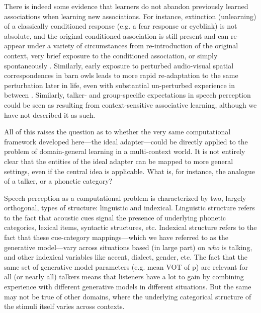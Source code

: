 There is indeed some evidence that learners do not abandon previously learned associations when learning new associations.  
For instance, extinction (unlearning) of a classically conditioned response (e.g. a fear response or eyeblink) is not absolute, and the original conditioned association is still present and can re-appear under a variety of circumstances from re-introduction of the original context, very brief exposure to the conditioned association, or simply spontaneously \cite{Thanellou2011,Bouton1983,Sissons2009}.
Similarly, early exposure to perturbed audio-visual spatial correspondences in barn owls leads to more rapid re-adaptation to the same perturbation later in life, even with substantial un-perturbed experience in between \cite{Kording2007a,Knudsen1998,Linkenhoker2005}.
Similarly, talker- and group-specific expectations in speech perception could be seen as resulting from  context-sensitive associative learning, although we have not described it as such.  

All of this raises the question as to whether the very same computational framework developed here---the ideal adapter---could be directly applied to the problem of domain-general learning in a multi-context world.  It is not entirely clear that the entities of the ideal adapter can be mapped to more general settings, even if the central idea is applicable.  What is, for instance, the analogue of a talker, or a phonetic category?

Speech perception as a computational problem is characterized by two, largely orthogonal, types of structure: linguistic and indexical.  Linguistic structure refers to the fact that acoustic cues signal the presence of underlying phonetic categories, lexical items, syntactic structures, etc.  Indexical structure refers to the fact that these cue-category mappings---which we have referred to as the generative model---vary across situations based (in large part) on \emph{who} is talking, and other indexical variables like accent, dialect, gender, etc.  The fact that the same set of generative model parameters (e.g. mean VOT of \ph p) are relevant for all (or nearly all) talkers means that listeners have a lot to gain by combining experience with different generative models in different situations.  But the same may not be true of other domains, where the underlying categorical structure of the stimuli itself varies across contexts.  

